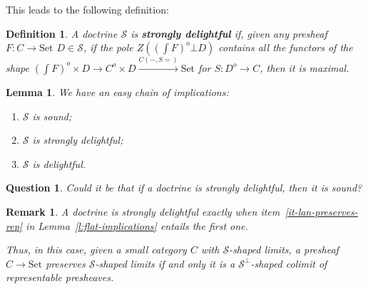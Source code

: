 \documentclass{article}
\newcommand{\Set}{\text{Set}}
\newtheorem{definition}[theorem]{Definition}
\newtheorem{question}[theorem]{Question}
\newtheorem{remark}[theorem]{Remark}
\newtheorem{lemma}[theorem]{Lemma}
\begin{document}
This leads to the following definition:
\begin{definition}
  A doctrine $\mathcal{S}$ is 
  \textbf{strongly delightful} if, given any presheaf $F:C\rightarrow \Set$
  $D \in \mathcal{S}$,
  if the pole $Z((\int F)^o \bot D)$ contains all the functors of the shape
   $(\int F)^o \times D \rightarrow C^o
  \times D \xrightarrow{C(-, S =)}{} \Set$ for $S : D^o \rightarrow C$, then it is maximal.
\end{definition}
\begin{lemma}
  We have an easy chain of implications:
  \begin{enumerate}
  \item $\mathcal{S}$ is sound;
  \item $\mathcal{S}$ is strongly delightful;
  \item $\mathcal{S}$ is delightful.
  \end{enumerate}
\end{lemma}
\begin{question}
  Could it be that if a doctrine is strongly delightful, then it is sound?
\end{question}
\begin{remark}
  \label{r:strong-delight-car}
  A doctrine is strongly delightful exactly when
  item~\ref{it-lan-preserves-rep} in Lemma~\ref{l:flat-implications} entails the first one.

  Thus, in this case, given a small category $C$ with $\mathcal{S}$-shaped limits, a presheaf
  $C \rightarrow \Set$ preserves $\mathcal{S}$-shaped limits if and only it is a
  $\mathcal{S}^\bot$-shaped colimit of representable presheaves.
\end{remark}
\end{document}
